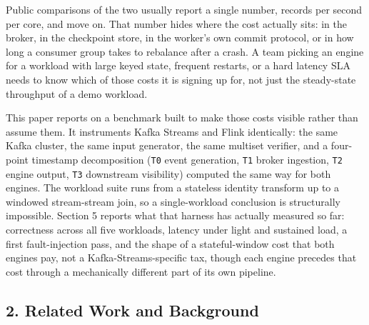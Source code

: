\documentclass[
]{article}
\begin{document}
Public comparisons of the two usually report a single number, records
per second per core, and move on. That number hides where the cost
actually sits: in the broker, in the checkpoint store, in the worker's
own commit protocol, or in how long a consumer group takes to rebalance
after a crash. A team picking an engine for a workload with large keyed
state, frequent restarts, or a hard latency SLA needs to know which of
those costs it is signing up for, not just the steady-state throughput
of a demo workload.

This paper reports on a benchmark built to make those costs visible
rather than assume them. It instruments Kafka Streams and Flink
identically: the same Kafka cluster, the same input generator, the same
multiset verifier, and a four-point timestamp decomposition (\texttt{T0}
event generation, \texttt{T1} broker ingestion, \texttt{T2} engine
output, \texttt{T3} downstream visibility) computed the same way for
both engines. The workload suite runs from a stateless identity
transform up to a windowed stream-stream join, so a single-workload
conclusion is structurally impossible. Section 5 reports what that
harness has actually measured so far: correctness across all five
workloads, latency under light and sustained load, a first
fault-injection pass, and the shape of a stateful-window cost that both
engines pay, not a Kafka-Streams-specific tax, though each engine precedes
that cost through a mechanically different part of its own pipeline.

\hypertarget{related-work-and-background}{%
\subsection{2. Related Work and
Background}\label{related-work-and-background}}
\end{document}
